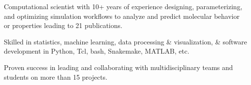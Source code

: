 
\begin{cventries}
  \cventry
    {}
    {}
    {}
    {}
    {
        \begin{cvitems}
            \item {Computational scientist with 10+ years of experience designing, parameterizing, and optimizing simulation workflows to analyze and predict molecular behavior or properties leading to 21 publications.}
            \item {Skilled in statistics, machine learning, data processing \& visualization, \& software development in Python, Tcl, bash, Snakemake, MATLAB, etc.}
            \item {Proven success in leading and collaborating with multidisciplinary teams and students on more than 15 projects.}
        \end{cvitems}
    }
\end{cventries}